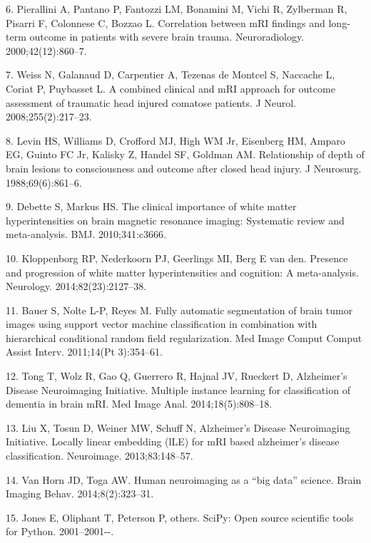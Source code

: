 \documentclass[11pt,]{article}
\begin{document}
\hypertarget{ref-Pierallini:2000aa}{}
6. Pierallini A, Pantano P, Fantozzi LM, Bonamini M, Vichi R, Zylberman
R, Pisarri F, Colonnese C, Bozzao L. Correlation between mRI findings
and long-term outcome in patients with severe brain trauma.
Neuroradiology. 2000;42(12):860--7.

\hypertarget{ref-Weiss:2008aa}{}
7. Weiss N, Galanaud D, Carpentier A, Tezenas de Montcel S, Naccache L,
Coriat P, Puybasset L. A combined clinical and mRI approach for outcome
assessment of traumatic head injured comatose patients. J Neurol.
2008;255(2):217--23.

\hypertarget{ref-Levin:1988aa}{}
8. Levin HS, Williams D, Crofford MJ, High WM Jr, Eisenberg HM, Amparo
EG, Guinto FC Jr, Kalisky Z, Handel SF, Goldman AM. Relationship of
depth of brain lesions to consciousness and outcome after closed head
injury. J Neurosurg. 1988;69(6):861--6.

\hypertarget{ref-Debette:2010aa}{}
9. Debette S, Markus HS. The clinical importance of white matter
hyperintensities on brain magnetic resonance imaging: Systematic review
and meta-analysis. BMJ. 2010;341:c3666.

\hypertarget{ref-Kloppenborg:2014aa}{}
10. Kloppenborg RP, Nederkoorn PJ, Geerlings MI, Berg E van den.
Presence and progression of white matter hyperintensities and cognition:
A meta-analysis. Neurology. 2014;82(23):2127--38.

\hypertarget{ref-Bauer:2011aa}{}
11. Bauer S, Nolte L-P, Reyes M. Fully automatic segmentation of brain
tumor images using support vector machine classification in combination
with hierarchical conditional random field regularization. Med Image
Comput Comput Assist Interv. 2011;14(Pt 3):354--61.

\hypertarget{ref-Tong:2014aa}{}
12. Tong T, Wolz R, Gao Q, Guerrero R, Hajnal JV, Rueckert D,
Alzheimer's Disease Neuroimaging Initiative. Multiple instance learning
for classification of dementia in brain mRI. Med Image Anal.
2014;18(5):808--18.

\hypertarget{ref-Liu:2013aa}{}
13. Liu X, Tosun D, Weiner MW, Schuff N, Alzheimer's Disease
Neuroimaging Initiative. Locally linear embedding (lLE) for mRI based
alzheimer's disease classification. Neuroimage. 2013;83:148--57.

\hypertarget{ref-Van-Horn:2014aa}{}
14. Van Horn JD, Toga AW. Human neuroimaging as a ``big data'' science.
Brain Imaging Behav. 2014;8(2):323--31.

\hypertarget{ref-scipy}{}
15. Jones E, Oliphant T, Peterson P, others. SciPy: Open source
scientific tools for Python. 2001--2001-\/-.
\end{document}
